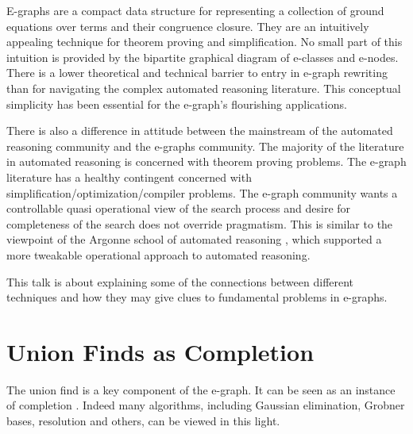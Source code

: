 \documentclass[sigplan,10pt,review,anonymous]{acmart}
\begin{document}
E-graphs \cite{eggpaper} are a compact data structure for representing a collection of ground equations over terms and their congruence closure.
They are an intuitively appealing technique for theorem proving and simplification. No small part of this intuition is provided by the bipartite graphical diagram of e-classes and e-nodes. There is a lower theoretical and technical barrier to entry in e-graph rewriting than for navigating the complex automated reasoning literature. This conceptual simplicity has been essential for the e-graph's flourishing applications.

There is also a difference in attitude between the mainstream of the automated reasoning community and the e-graphs community. The majority of the literature in automated reasoning is concerned with theorem proving problems. The e-graph literature has a healthy contingent concerned with simplification/optimization/compiler problems. The e-graph community wants a controllable quasi operational view of the search process and desire for completeness of the search does not override pragmatism. This is similar to the viewpoint of the Argonne school of automated reasoning \cite{ottermanual} \cite{wosautomated}, which supported a more tweakable operational approach to automated reasoning.

This talk is about explaining some of the connections between different techniques and how they may give clues to fundamental problems in e-graphs.







\section{Union Finds as Completion}
The union find is a key component of the e-graph. It can be seen as an instance of completion \cite{groundegraph}. Indeed many algorithms, including Gaussian elimination, Grobner bases, resolution and others, can be viewed in this light.
\end{document}
